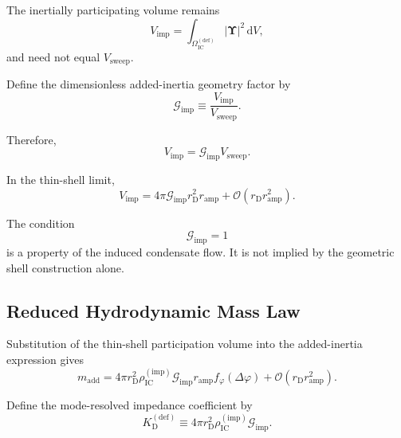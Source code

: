 The inertially participating volume remains
\begin{equation}
    V_{\mathrm{imp}} = \int_{\Omega_{\mathrm{IC}}^{(\mathrm{def})}} \left| \boldsymbol{\Upsilon} \right|^2 \, \mathrm{d}V,
\end{equation}
and need not equal $V_{\mathrm{sweep}}$.

Define the dimensionless added-inertia geometry factor by
\begin{equation}
    \boxed{ \mathcal{G}_{\mathrm{imp}} \equiv \frac{ V_{\mathrm{imp}} }{ V_{\mathrm{sweep}} } }.
\end{equation}

Therefore,
\begin{equation}
    \boxed{ V_{\mathrm{imp}} = \mathcal{G}_{\mathrm{imp}} V_{\mathrm{sweep}} }.
\end{equation}

In the thin-shell limit,
\begin{equation}
    \boxed{ V_{\mathrm{imp}} = 4\pi \mathcal{G}_{\mathrm{imp}} r_{\mathrm{D}}^2 r_{\mathrm{amp}} + \mathcal{O} \left( r_{\mathrm{D}}r_{\mathrm{amp}}^2 \right) }.
\end{equation}

The condition
\begin{equation}
    \mathcal{G}_{\mathrm{imp}} = 1
\end{equation}
is a property of the induced condensate flow. It is not implied by the geometric shell construction alone.

\subsection{Reduced Hydrodynamic Mass Law}

Substitution of the thin-shell participation volume into the added-inertia expression gives
\begin{equation}
    m_{\mathrm{add}} = 4\pi r_{\mathrm{D}}^2 \rho_{\mathrm{IC}}^{(\mathrm{imp})} \mathcal{G}_{\mathrm{imp}} r_{\mathrm{amp}} f_{\varphi}(\Delta\varphi) + \mathcal{O} \left( r_{\mathrm{D}}r_{\mathrm{amp}}^2 \right).
\end{equation}

Define the mode-resolved impedance coefficient by
\begin{equation}
    \boxed{ K_{\mathrm{D}}^{(\mathrm{def})} \equiv 4\pi r_{\mathrm{D}}^2 \rho_{\mathrm{IC}}^{(\mathrm{imp})} \mathcal{G}_{\mathrm{imp}} }.
\end{equation}


